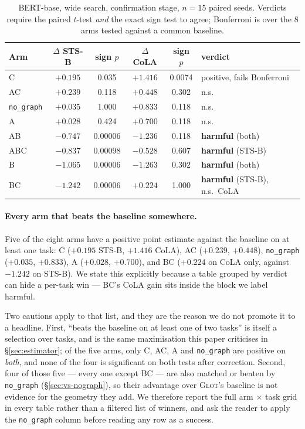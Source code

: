 \documentclass{article} %
\begin{document}
\begin{table}[t]
\caption{BERT-base, wide search, confirmation stage, $n=15$ paired seeds.
Verdicts require the paired $t$-test \emph{and} the exact sign test to agree;
Bonferroni is over the 8 arms tested against a common baseline.}
\label{tab:wide}
\begin{center}
\begin{tabular}{lccccl}
\toprule
Arm & $\Delta$ STS-B & sign $p$ & $\Delta$ CoLA & sign $p$ & verdict \\
\midrule
C   & $+0.195$ & 0.035 & $\mathbf{+1.416}$ & 0.0074 & positive, fails Bonferroni \\
AC  & $+0.239$ & 0.118 & $+0.448$ & 0.302 & n.s. \\
\texttt{no\_graph} & $+0.035$ & 1.000 & $+0.833$ & 0.118 & n.s. \\
A   & $+0.028$ & 0.424 & $+0.700$ & 0.118 & n.s. \\
\midrule
AB  & $-0.747$ & 0.00006 & $-1.236$ & 0.118 & \textbf{harmful} (both) \\
ABC & $-0.837$ & 0.00098 & $-0.528$ & 0.607 & \textbf{harmful} (STS-B) \\
B   & $-1.065$ & 0.00006 & $-1.263$ & 0.302 & \textbf{harmful} (both) \\
BC  & $-1.242$ & 0.00006 & $+0.224$ & 1.000 & \textbf{harmful} (STS-B), n.s.\ CoLA \\
\bottomrule
\end{tabular}
\end{center}
\end{table}

\paragraph{Every arm that beats the baseline somewhere.} Five of the eight arms
have a positive point estimate against the baseline on at least one task:
C ($+0.195$ STS-B, $+1.416$ CoLA), AC ($+0.239$, $+0.448$), \texttt{no\_graph}
($+0.035$, $+0.833$), A ($+0.028$, $+0.700$), and BC ($+0.224$ on CoLA only,
against $-1.242$ on STS-B). We state this explicitly because a table grouped by
verdict can hide a per-task win --- BC's CoLA gain sits inside the block we
label harmful.

Two cautions apply to that list, and they are the reason we do not promote it
to a headline. First, ``beats the baseline on at least one of two tasks'' is
itself a selection over tasks, and is the same maximisation this paper
criticises in \S\ref{sec:estimator}; of the five arms, only C, AC, A and
\texttt{no\_graph} are positive on \emph{both}, and none of the four is
significant on both tests after correction. Second, four of those five --- every
one except BC --- are also matched or beaten by \texttt{no\_graph}
(\S\ref{sec:vs-nograph}), so their advantage over \textsc{Glot}'s baseline is
not evidence for the geometry they add. We therefore report the full arm
$\times$ task grid in every table rather than a filtered list of winners, and
ask the reader to apply the \texttt{no\_graph} column before reading any row as
a success.
\end{document}
